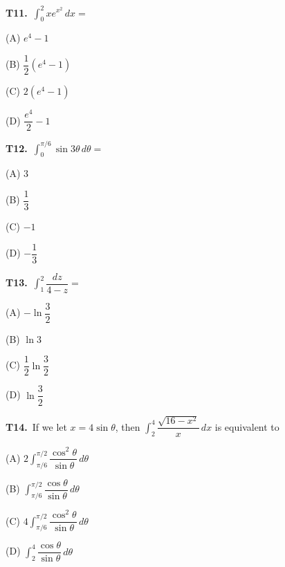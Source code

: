 \documentclass[11pt]{article}
\begin{document}
\bigskip\noindent\textbf{T11.}\ $\displaystyle\int_{0}^{2} xe^{x^2}\,dx =$
\begin{list}{}{\setlength{\leftmargin}{3em}\setlength{\labelwidth}{2.5em}\setlength{\itemsep}{0pt}\setlength{\topsep}{2pt}}
\item[(A)] $e^4-1$
\item[(B)] $\dfrac{1}{2}(e^4-1)$
\item[(C)] $2(e^4-1)$
\item[(D)] $\dfrac{e^4}{2}-1$
\end{list}

\bigskip\noindent\textbf{T12.}\ $\displaystyle\int_{0}^{\pi/6} \sin 3\theta\,d\theta =$
\begin{list}{}{\setlength{\leftmargin}{3em}\setlength{\labelwidth}{2.5em}\setlength{\itemsep}{0pt}\setlength{\topsep}{2pt}}
\item[(A)] $3$
\item[(B)] $\dfrac{1}{3}$
\item[(C)] $-1$
\item[(D)] $-\dfrac{1}{3}$
\end{list}

\bigskip\noindent\textbf{T13.}\ $\displaystyle\int_{1}^{2} \dfrac{dz}{4-z} =$
\begin{list}{}{\setlength{\leftmargin}{3em}\setlength{\labelwidth}{2.5em}\setlength{\itemsep}{0pt}\setlength{\topsep}{2pt}}
\item[(A)] $-\ln\dfrac{3}{2}$
\item[(B)] $\ln 3$
\item[(C)] $\dfrac{1}{2}\ln\dfrac{3}{2}$
\item[(D)] $\ln\dfrac{3}{2}$
\end{list}

\bigskip\noindent\textbf{T14.}\ If we let $x=4\sin\theta$, then $\displaystyle\int_{2}^{4} \dfrac{\sqrt{16-x^2}}{x}\,dx$ is equivalent to
\begin{list}{}{\setlength{\leftmargin}{3em}\setlength{\labelwidth}{2.5em}\setlength{\itemsep}{0pt}\setlength{\topsep}{2pt}}
\item[(A)] $\displaystyle 2\int_{\pi/6}^{\pi/2} \dfrac{\cos^2\theta}{\sin\theta}\,d\theta$
\item[(B)] $\displaystyle \int_{\pi/6}^{\pi/2} \dfrac{\cos\theta}{\sin\theta}\,d\theta$
\item[(C)] $\displaystyle 4\int_{\pi/6}^{\pi/2} \dfrac{\cos^2\theta}{\sin\theta}\,d\theta$
\item[(D)] $\displaystyle \int_{2}^{4} \dfrac{\cos\theta}{\sin\theta}\,d\theta$
\end{list}
\end{document}
